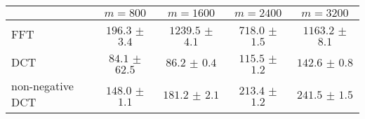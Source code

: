 \centering
\renewcommand{\arraystretch}{1.2}
\begin{tabular}{@{}lcccc@{}}
\toprule
 & $m=800$ & $m=1600$ & $m=2400$ & $m=3200$\\
\midrule
FFT & $196.3$ $\pm$ $3.4$ & $1239.5$ $\pm$ $4.1$ & $718.0$ $\pm$ $1.5$ & $1163.2$ $\pm$ $8.1$ \\
DCT & $84.1$ $\pm$ $62.5$ & $86.2$ $\pm$ $0.4$ & $115.5$ $\pm$ $1.2$ & $142.6$ $\pm$ $0.8$ \\
non-negative DCT & $148.0$ $\pm$ $1.1$ & $181.2$ $\pm$ $2.1$ & $213.4$ $\pm$ $1.2$ & $241.5$ $\pm$ $1.5$ \\
\bottomrule
\end{tabular}
